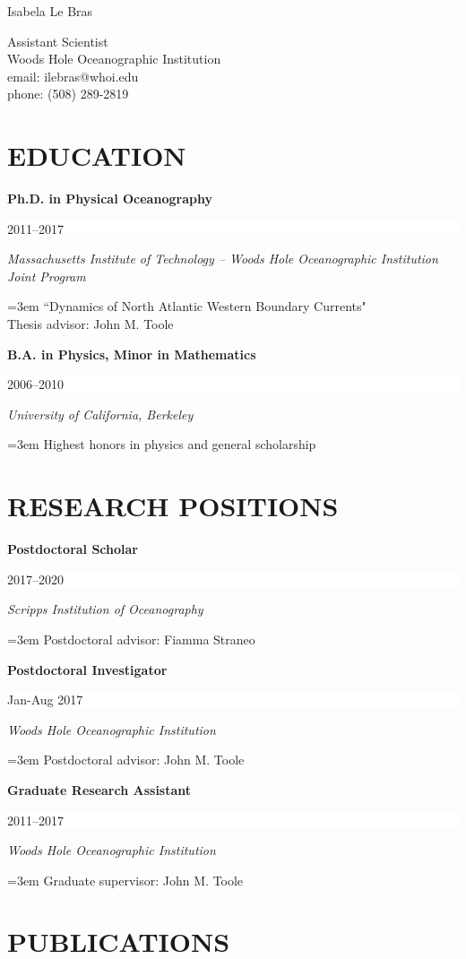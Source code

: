 \documentclass[paper=letter,fontsize=11pt]{scrartcl} %
\newcommand{\sepspace}{\vspace*{3mm}}		%
\newcommand{\MyName}[1]{ %
		\huge  \textbf \hfill #1 %
		\par \normalsize \normalfont}
\newcommand{\MySlogan}[1]{ %
		\large \hfill #1 %
		\par \normalsize \normalfont}
\newcommand{\NewPart}[2]{\section*{\uppercase{#1} #2}}
\newcommand{\EducationEntry}[4]{
		\noindent \textbf{#1} \hfill      %
		\colorbox{White}{%
			\parbox{8em}{%
			\hfill\color{Black}#2}} \par  %
		\noindent \textit{#3} \par        %
		\noindent\hangindent=3em\hangafter=0 #4 %
		 \par}
\begin{document}


\MyName{Isabela Le Bras}
\MySlogan{\vspace{-0.3in}\begin{flushright}Assistant Scientist\\
Woods Hole Oceanographic Institution\\
email: ilebras@whoi.edu\\
phone: (508) 289-2819\\
\end{flushright}}


\NewPart{Education}{}

\EducationEntry{Ph.D. in Physical Oceanography}{2011--2017}{Massachusetts Institute of Technology -- Woods Hole Oceanographic Institution Joint Program}{``Dynamics of North Atlantic Western Boundary Currents"\\
Thesis advisor: John M. Toole}
\sepspace

\EducationEntry{B.A. in Physics, Minor in Mathematics}{2006--2010}{University of California, Berkeley}{Highest honors in physics and general scholarship}

\NewPart{Research Positions}{}

\EducationEntry{{Postdoctoral Scholar}}{2017--2020}{Scripps Institution of Oceanography}{Postdoctoral advisor: Fiamma Straneo}

\sepspace

\EducationEntry{Postdoctoral Investigator}{Jan-Aug 2017}{Woods Hole Oceanographic Institution}
{Postdoctoral advisor: John M. Toole}

\sepspace

\EducationEntry{Graduate Research Assistant}{2011--2017}{Woods Hole Oceanographic Institution}
{Graduate supervisor: John M. Toole}



\NewPart{Publications}{}
\end{document}
